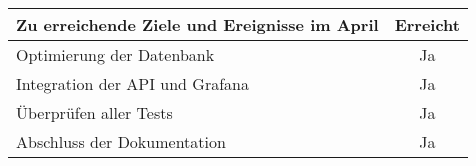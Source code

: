 \begin{tabularx}{\textwidth}{Xc}
    \arrayrulecolor{OliveGreen}
    \toprule
    {\bfseries Zu erreichende Ziele und Ereignisse im April} & {\bfseries Erreicht} \\
    \midrule[2pt]
    Optimierung der Datenbank      &Ja                    \\
    \rowcolor{OliveGreen!15}
    Integration der API und Grafana                              &Ja                    \\
    \rowcolor{White}
    Überprüfen aller Tests      &Ja                    \\
    \rowcolor{OliveGreen!15}
    Abschluss der Dokumentation                             &Ja                    \\
    \bottomrule[2pt]
\end{tabularx}
